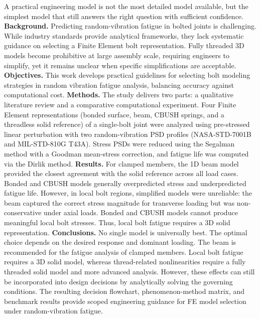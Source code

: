\documentclass[a4paper,twoside]{bth}
\begin{document}
A practical engineering model is not the most detailed model available, but the simplest model that still answers the right question with sufficient confidence.\\
\noindent
\textbf{Background.}
Predicting random-vibration fatigue in bolted joints is challenging. While industry standards provide analytical frameworks, they lack systematic guidance on selecting a Finite Element bolt representation. Fully threaded 3D models become prohibitive at large assembly scale, requiring engineers to simplify, yet it remains unclear when specific simplifications are acceptable.
\newline
\textbf{Objectives.}
This work develops practical guidelines for selecting bolt modeling strategies in random vibration fatigue analysis, balancing accuracy against computational cost.
\newline
\textbf{Methods.}
The study delivers two parts: a qualitative literature review and a comparative computational experiment. Four Finite Element representations (bonded surface, beam, CBUSH springs, and a threadless solid reference) of a single-bolt joint were analyzed using pre-stressed linear perturbation with two random-vibration \ac{PSD} profiles (NASA-STD-7001B and MIL-STD-810G T43A). Stress PSDs were reduced using the Segalman method with a Goodman mean-stress correction, and fatigue life was computed via the Dirlik method. 
\newline
\textbf{Results.}
For clamped members, the 1D beam model provided the closest agreement with the solid reference across all load cases. Bonded and CBUSH models generally overpredicted stress and underpredicted fatigue life. However, in local bolt regions, simplified models were unreliable: the beam captured the correct stress magnitude for transverse loading but was non-conservative under axial loads. Bonded and CBUSH models cannot produce meaningful local bolt stresses. Thus, local bolt fatigue requires a 3D solid representation.
\newline
\textbf{Conclusions.}
No single model is universally best. The optimal choice depends on the desired response and dominant loading. The beam is recommended for the fatigue analysis of clamped members. Local bolt fatigue requires a 3D solid model, whereas thread-related nonlinearities require a fully threaded solid model and more advanced analysis. However, these effects can still be incorporated into design decisions by analytically solving the governing conditions. The resulting decision flowchart, phenomenon-method matrix, and benchmark results provide scoped engineering guidance for \ac{FE} model selection under random-vibration fatigue.
\end{document}
